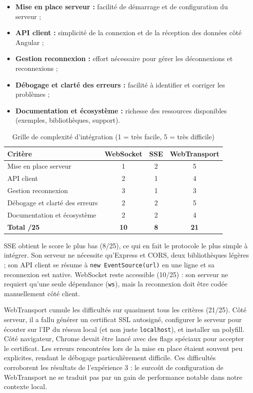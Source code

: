 \begin{itemize}
    \item \textbf{Mise en place serveur :} facilité de démarrage et de configuration du serveur ;
    \item \textbf{API client :} simplicité de la connexion et de la réception des données côté Angular ;
    \item \textbf{Gestion reconnexion :} effort nécessaire pour gérer les déconnexions et reconnexions ;
    \item \textbf{Débogage et clarté des erreurs :} facilité à identifier et corriger les problèmes ;
    \item \textbf{Documentation et écosystème :} richesse des ressources disponibles (exemples, bibliothèques, support).
\end{itemize}

\begin{table}[H]
\centering
\begin{tabular}{|l|c|c|c|}
\hline
\textbf{Critère} & \textbf{WebSocket} & \textbf{SSE} & \textbf{WebTransport} \\
\hline
Mise en place serveur & 1 & 2 & 5 \\
API client & 2 & 1 & 4 \\
Gestion reconnexion & 3 & 1 & 3 \\
Débogage et clarté des erreurs & 2 & 2 & 5 \\
Documentation et écosystème & 2 & 2 & 4 \\
\hline
\textbf{Total /25} & \textbf{10} & \textbf{8} & \textbf{21} \\
\hline
\end{tabular}
\caption{Grille de complexité d'intégration (1 = très facile, 5 = très difficile)}
\end{table}

SSE obtient le score le plus bas (8/25), ce qui en fait le protocole le plus simple à intégrer. Son serveur ne nécessite qu'Express et CORS, deux bibliothèques légères ; son API client se résume à \texttt{new EventSource(url)} en une ligne et sa reconnexion est native. WebSocket reste accessible (10/25) : son serveur ne requiert qu'une seule dépendance (\texttt{ws}), mais la reconnexion doit être codée manuellement côté client.

WebTransport cumule les difficultés sur quasiment tous les critères (21/25). Côté serveur, il a fallu générer un certificat SSL autosigné, configurer le serveur pour écouter sur l'IP du réseau local (et non juste \texttt{localhost}), et installer un polyfill. Côté navigateur, Chrome devait être lancé avec des flags spéciaux pour accepter le certificat. Les erreurs rencontrées lors de la mise en place étaient souvent peu explicites, rendant le débogage particulièrement difficile. Ces difficultés corroborent les résultats de l'expérience 3 : le surcoût de configuration de WebTransport ne se traduit pas par un gain de performance notable dans notre contexte local.

